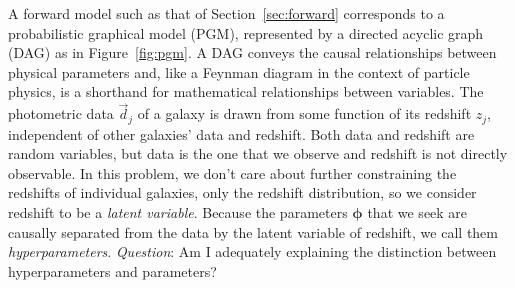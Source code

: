 \documentclass[iop]{emulateapj}
\newcommand{\todo}[3]{{\color{#2}\emph{#1}: #3}}
\newcommand{\que}[1]{\todo{Question}{cyan}{#1}}
\newcommand{\Sect}[1]{Section~\ref{#1}}
\newcommand{\Fig}[1]{Figure~\ref{#1}}
\newcommand{\data}{\ensuremath{\vec{d}}}%
\newcommand{\bvec}[1]{\ensuremath{\boldsymbol{#1}}}%
\newcommand{\ndphi}{\bvec{\phi}}
\begin{document}
A forward model such as that of \Sect{sec:forward} corresponds to a probabilistic graphical model (PGM), represented by a directed acyclic graph (DAG) as in \Fig{fig:pgm}.
A DAG conveys the causal relationships between physical parameters and, like a Feynman diagram in the context of particle physics, is a shorthand for mathematical relationships between variables.
The photometric data $\data_{j}$ of a galaxy is drawn from some function of its redshift $z_{j}$, independent of other galaxies' data and redshift.
Both data and redshift are random variables, but data is the one that we observe and redshift is not directly observable.
In this problem, we don't care about further constraining the redshifts of individual galaxies, only the redshift distribution, so we consider redshift to be a \textit{latent variable}.
Because the parameters $\ndphi$ that we seek are causally separated from the data by the latent variable of redshift, we call them \textit{hyperparameters}.
\que{Am I adequately explaining the distinction between hyperparameters and parameters?}
\end{document}
